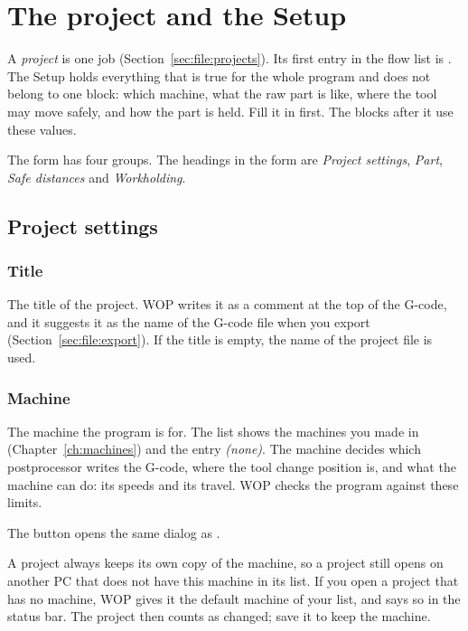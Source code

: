 \chapter{The project and the Setup}\label{ch:project}

A \emph{project} is one job (Section~\ref{sec:file:projects}). Its first entry in the flow list is . The Setup holds everything that is true for the whole program and does not belong to one block: which machine, what the raw part is like, where the tool may move safely, and how the part is held. Fill it in first. The blocks after it use these values.


The form has four groups. The headings in the form are \emph{Project settings}, \emph{Part}, \emph{Safe distances} and \emph{Workholding}.

\section{Project settings}\label{sec:project:settings}

\subsection{Title}
The title of the project. WOP writes it as a comment at the top of the G-code, and it suggests it as the name of the G-code file when you export (Section~\ref{sec:file:export}). If the title is empty, the name of the project file is used.

\subsection{Machine}\label{sec:project:machine}
The machine the program is for. The list shows the machines you made in  (Chapter~\ref{ch:machines}) and the entry \emph{(none)}. The machine decides which postprocessor writes the G-code, where the tool change position is, and what the machine can do: its speeds and its travel. WOP checks the program against these limits.

The button  opens the same dialog as .

A project always keeps its own copy of the machine, so a project still opens on another PC that does not have this machine in its list. If you open a project that has no machine, WOP gives it the default machine of your list, and says so in the status bar. The project then counts as changed; save it to keep the machine.

